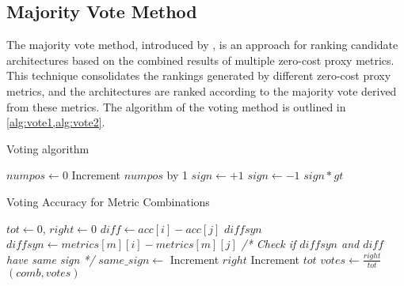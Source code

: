 \subsection{Majority Vote Method}\label{subsec:vote}

The majority vote method, introduced by \cite{abdelfattah2021zero}, is an approach for ranking candidate architectures based on the combined results of multiple zero-cost proxy metrics. This technique consolidates the rankings generated by different zero-cost proxy metrics, and the architectures are ranked according to the majority vote derived from these metrics. The algorithm of the voting method is outlined in \cref{alg:vote1,alg:vote2}. 
\begin{algorithm}[h!]
\caption{Voting algorithm}\label{alg:vote1}
\begin{algorithmic}[1]
    \State $numpos \leftarrow 0$
            \State Increment $numpos$ by 1
        \EndIf
    \EndFor
        \State $sign \leftarrow +1$
    \Else
        \State $sign \leftarrow -1$
    \EndIf
    \State \Return $sign * gt$ 
\EndFunction
\end{algorithmic}
\end{algorithm}

\begin{algorithm}[ht!]
\caption{Voting Accuracy for Metric Combinations}\label{alg:vote2}
\begin{algorithmic}[1]
    \State $tot \leftarrow 0$, $right \leftarrow 0$
        \State $diff \leftarrow acc[i] - acc[j]$
            \State $diffsyn$ 
                \State $diffsyn \leftarrow metrics[m][i] - metrics[m][j]$
            \EndFor
            \State \textit{/* Check if $diffsyn$ and $diff$ have same sign */}
            \State $same\_sign \leftarrow$ 
                \State Increment $right$ 
            \EndIf
            \State Increment $tot$
        \EndIf
    \EndFor
    \State $votes \leftarrow \frac{right}{tot}$ 
    \State \Return $(comb, votes)$
\EndFunction
\end{algorithmic}
\end{algorithm}


